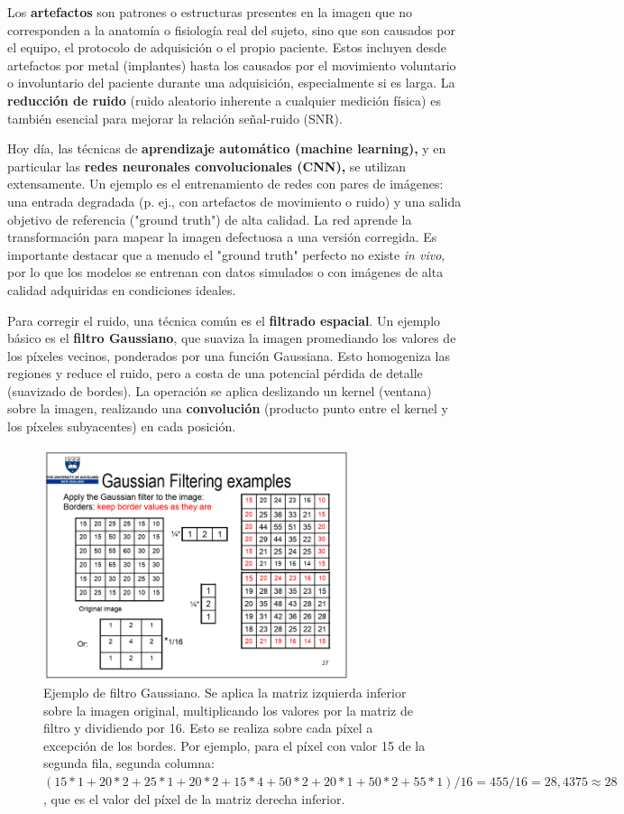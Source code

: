 Los \textbf{artefactos} son patrones o estructuras presentes en la imagen que no corresponden a la anatomía o fisiología real del sujeto, sino que son causados por el equipo, el protocolo de adquisición o el propio paciente. Estos incluyen desde artefactos por metal (implantes) hasta los causados por el movimiento voluntario o involuntario del paciente durante una adquisición, especialmente si es larga. La \textbf{reducción de ruido} (ruido aleatorio inherente a cualquier medición física) es también esencial para mejorar la relación señal-ruido (SNR).

Hoy día, las técnicas de \textbf{aprendizaje automático (machine learning),} y en particular las \textbf{redes neuronales convolucionales (CNN),} se utilizan extensamente. Un ejemplo es el entrenamiento de redes con pares de imágenes: una entrada degradada (p. ej., con artefactos de movimiento o ruido) y una salida objetivo de referencia ("ground truth") de alta calidad. La red aprende la transformación para mapear la imagen defectuosa a una versión corregida. Es importante destacar que a menudo el "ground truth" perfecto no existe \textit{in vivo}, por lo que los modelos se entrenan con datos simulados o con imágenes de alta calidad adquiridas en condiciones ideales.

Para corregir el ruido, una técnica común es el \textbf{filtrado espacial}. Un ejemplo básico es el \textbf{filtro Gaussiano}, que suaviza la imagen promediando los valores de los píxeles vecinos, ponderados por una función Gaussiana. Esto homogeniza las regiones y reduce el ruido, pero a costa de una potencial pérdida de detalle (suavizado de bordes). La operación se aplica deslizando un kernel (ventana) sobre la imagen, realizando una \textbf{convolución} (producto punto entre el kernel y los píxeles subyacentes) en cada posición.

\begin{figure}[h]
\centering
\includegraphics[width = 0.8\textwidth]{figs/gaussian-filter.png}
\caption{Ejemplo de filtro Gaussiano. Se aplica la matriz izquierda inferior sobre la imagen original, multiplicando los valores por la matriz de filtro y dividiendo por 16. Esto se realiza sobre cada píxel a excepción de los bordes. Por ejemplo, para el píxel con valor 15 de la segunda fila, segunda columna: $(15*1 + 20 * 2 + 25 * 1 + 20 * 2 + 15 * 4 + 50 * 2 + 20 * 1 + 50 * 2 + 55 * 1)/16 = 455/16 = 28,4375 \approx 28$, que es el valor del píxel de la matriz derecha inferior.}
\end{figure}

